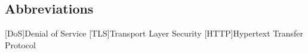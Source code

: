 \newcommand{\abbr}{Abbreviations}
\subsection{Abbreviations}

\begin{acronym}[1234567890]		%
\setlength{\itemsep}{-\parsep}	%

[DoS]{Denial of Service}
[TLS]{Transport Layer Security}
[HTTP]{Hypertext Transfer Protocol}

\end{acronym}